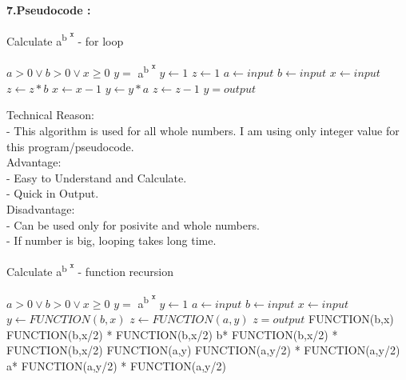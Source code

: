 \documentclass[a4paper,10pt]{article}
\begin{document}
{\Large\textbf{7.Pseudocode :}\\}
\begin{algorithm}
\caption{Calculate  a\textsuperscript{b \textsuperscript{x}} - for loop}
\begin{algorithmic} 
\REQUIRE $a > 0 \vee b > 0 \vee x \geq 0$
\ENSURE $y = $ a\textsuperscript{b \textsuperscript{x}}
\STATE $y \leftarrow 1$
\STATE $z \leftarrow 1$
\STATE $a \leftarrow input$
\STATE $b \leftarrow input$
\STATE $x \leftarrow input$
\STATE $z \leftarrow z*b$
\STATE $x \leftarrow x-1$
\ENDWHILE
{}
\STATE $y \leftarrow y*a$
\STATE $z \leftarrow z-1$
\ENDWHILE
\STATE $y = output$
\end{algorithmic}
\end{algorithm}
\newline
\indent\indent
{\large{Technical Reason:}\\}
\indent\indent\indent
{\fontsize{12}{16}\selectfont - This algorithm is used for all whole numbers. I am using only integer value for this program/pseudocode.\\}
\newline
\indent\indent
{\large{Advantage:}\\}
\indent\indent\indent
{\fontsize{12}{16}\selectfont - Easy to Understand and Calculate.\\}
\indent\indent\indent
{\fontsize{12}{16}\selectfont - Quick in Output.\\}
\newline
\indent\indent
{\large{Disadvantage:}\\}
\indent\indent\indent
{\fontsize{12}{16}\selectfont - Can be used only for posivite and whole numbers.\\}
\indent\indent\indent
{\fontsize{12}{16}\selectfont - If number is big, looping takes long time.\\}
\pagebreak
\begin{algorithm}
\caption{Calculate  a\textsuperscript{b \textsuperscript{x}} - function recursion }
\begin{algorithmic} 
\REQUIRE $a > 0 \vee b > 0 \vee x \geq 0$
\ENSURE $y = $ a\textsuperscript{b \textsuperscript{x}}
\STATE $y \leftarrow 1$
\STATE $a \leftarrow input$
\STATE $b \leftarrow input$
\STATE $x \leftarrow input$
\STATE $y \leftarrow FUNCTION(b,x)$
\STATE $z \leftarrow FUNCTION(a,y)$
\STATE $z = output $
\STATE FUNCTION(b,x)
\ENDIF
{}
\RETURN FUNCTION(b,x/2) * FUNCTION(b,x/2)
\ELSE
\RETURN b* FUNCTION(b,x/2) * FUNCTION(b,x/2)
\ENDIF\STATE FUNCTION(a,y)
\ENDIF
{}
\RETURN FUNCTION(a,y/2) * FUNCTION(a,y/2)
\ELSE
\RETURN a* FUNCTION(a,y/2) * FUNCTION(a,y/2)
\ENDIF
\end{algorithmic}
\end{algorithm}
\end{document}
